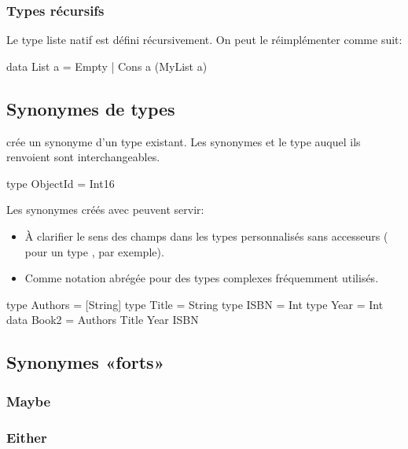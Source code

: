 \subsubsection{Types récursifs}

Le type liste natif est défini récursivement. On peut le réimplémenter comme suit:

\begin{haskellcode}
data List a = Empty | Cons a (MyList a)
\end{haskellcode}

\subsection{Synonymes de types}

 crée un synonyme d'un type existant. Les synonymes et le type auquel ils
renvoient sont interchangeables.

\begin{haskellcode}
type ObjectId = Int16
\end{haskellcode}

Les synonymes créés avec  peuvent servir:

\begin{itemize}
    \item À clarifier le sens des champs dans les types personnalisés sans accesseurs ( pour un type , par exemple).
    \item Comme notation abrégée pour des types complexes fréquemment utilisés.
\end{itemize}

\begin{haskellcode}
type Authors = [String]
type Title = String
type ISBN = Int
type Year = Int
data Book2 = Authors Title Year ISBN
\end{haskellcode}

\subsection{Synonymes «forts»}

\subsubsection{Maybe}

\subsubsection{Either}
